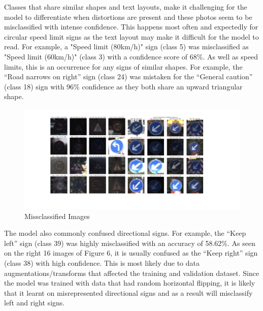 \documentclass{article} %
\begin{document}
    Classes that share similar shapes and text layouts, make it challenging for the model to differentiate when distortions are present and these photos seem to be misclassified with intense confidence. This happens most often and expectedly for circular speed limit signs as the text layout may make it difficult for the model to read. For example, a "Speed limit (80km/h)" sign (class 5) was misclassified as "Speed limit (60km/h)" (class 3) with a confidence score of 68\%. As well as speed limits, this is an occurrence for any signs of similar shapes. For example, the “Road narrows on right” sign (class 24) was mistaken for the “General caution” (class 18) sign with 96\% confidence as they both share an upward triangular shape. 
   \begin{figure}[h]
       \centering
       \includegraphics[width=0.5\linewidth]{Missclassified Images .png}
       \caption{Missclassified Images}
       \label{fig:enter-label}
   \end{figure}

    The model also commonly confused directional signs. For example, the “Keep left” sign (class 39) was highly misclassified with an accuracy of 58.62\%. As seen on the right 16 images of Figure 6, it is usually confused as the “Keep right” sign (class 38) with high confidence. This is most likely due to data augmentations/transforms that affected the training and validation dataset. Since the model was trained with data that had random horizontal flipping, it is likely that it learnt on misrepresented directional signs and as a result will misclassify left and right signs.
\end{document}
